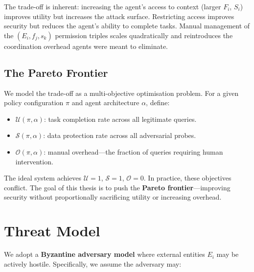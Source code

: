 The trade-off is inherent: increasing the agent's access to context (larger $F_i$, $S_i$) improves utility but increases the attack surface. Restricting access improves security but reduces the agent's ability to complete tasks. Manual management of the $(E_i, f_j, s_k)$ permission triples scales quadratically and reintroduces the coordination overhead agents were meant to eliminate.

\subsection{The Pareto Frontier}

We model the trade-off as a multi-objective optimisation problem. For a given policy configuration $\pi$ and agent architecture $\alpha$, define:

\begin{itemize}
    \item $\mathcal{U}(\pi, \alpha)$: task completion rate across all legitimate queries.
    \item $\mathcal{S}(\pi, \alpha)$: data protection rate across all adversarial probes.
    \item $\mathcal{O}(\pi, \alpha)$: manual overhead---the fraction of queries requiring human intervention.
\end{itemize}

The ideal system achieves $\mathcal{U} = 1$, $\mathcal{S} = 1$, $\mathcal{O} = 0$. In practice, these objectives conflict. The goal of this thesis is to push the \textbf{Pareto frontier}---improving security without proportionally sacrificing utility or increasing overhead.

\section{Threat Model}
\label{sec:threat_model}

We adopt a \textbf{Byzantine adversary model} where external entities $E_i$ may be actively hostile. Specifically, we assume the adversary may:

